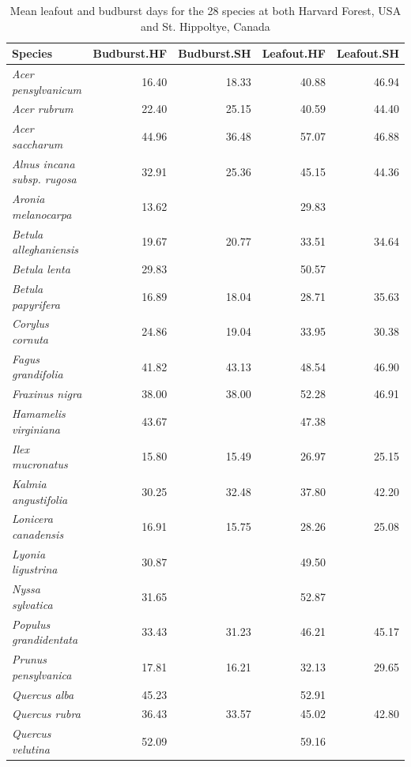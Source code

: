 \documentclass{article}
\begin{document}
\begin{table}[ht]
\centering
\caption{Mean leafout and budburst days for the 28 species at both Harvard Forest, USA and St. Hippoltye, Canada} 
\begin{tabular}{lrrrr}
  \hline
Species & Budburst.HF & Budburst.SH & Leafout.HF & Leafout.SH \\ 
  \hline
\textit{Acer pensylvanicum} & 16.40 & 18.33 & 40.88 & 46.94 \\ 
  \textit{Acer rubrum} & 22.40 & 25.15 & 40.59 & 44.40 \\ 
  \textit{Acer saccharum} & 44.96 & 36.48 & 57.07 & 46.88 \\ 
  \textit{Alnus incana subsp. rugosa} & 32.91 & 25.36 & 45.15 & 44.36 \\ 
  \textit{Aronia melanocarpa} & 13.62 &  & 29.83 &  \\ 
  \textit{Betula alleghaniensis} & 19.67 & 20.77 & 33.51 & 34.64 \\ 
  \textit{Betula lenta} & 29.83 &  & 50.57 &  \\ 
  \textit{Betula papyrifera} & 16.89 & 18.04 & 28.71 & 35.63 \\ 
  \textit{Corylus cornuta} & 24.86 & 19.04 & 33.95 & 30.38 \\ 
  \textit{Fagus grandifolia} & 41.82 & 43.13 & 48.54 & 46.90 \\ 
  \textit{Fraxinus nigra} & 38.00 & 38.00 & 52.28 & 46.91 \\ 
  \textit{Hamamelis virginiana} & 43.67 &  & 47.38 &  \\ 
  \textit{Ilex mucronatus} & 15.80 & 15.49 & 26.97 & 25.15 \\ 
  \textit{Kalmia angustifolia} & 30.25 & 32.48 & 37.80 & 42.20 \\ 
  \textit{Lonicera canadensis} & 16.91 & 15.75 & 28.26 & 25.08 \\ 
  \textit{Lyonia ligustrina} & 30.87 &  & 49.50 &  \\ 
  \textit{Nyssa sylvatica} & 31.65 &  & 52.87 &  \\ 
  \textit{Populus grandidentata} & 33.43 & 31.23 & 46.21 & 45.17 \\ 
  \textit{Prunus pensylvanica} & 17.81 & 16.21 & 32.13 & 29.65 \\ 
  \textit{Quercus alba} & 45.23 &  & 52.91 &  \\ 
  \textit{Quercus rubra} & 36.43 & 33.57 & 45.02 & 42.80 \\ 
  \textit{Quercus velutina} & 52.09 &  & 59.16 &  \\ 

\end{tabular}
\end{table}
\end{document}
